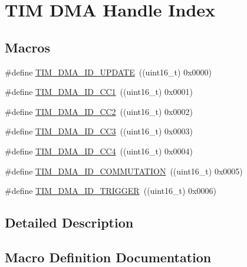 \hypertarget{group___d_m_a___handle__index}{}\section{T\+IM D\+MA Handle Index}
\label{group___d_m_a___handle__index}
\subsection*{Macros}
\begin{DoxyCompactItemize}
\item 
\#define \hyperlink{group___d_m_a___handle__index_ga15f38cee11f8b2b5a85cbf4552ba140d}{T\+I\+M\+\_\+\+D\+M\+A\+\_\+\+I\+D\+\_\+\+U\+P\+D\+A\+TE}~((uint16\+\_\+t) 0x0000)
\item 
\#define \hyperlink{group___d_m_a___handle__index_ga7ca691eb5e29b0206d3390cc6e90079a}{T\+I\+M\+\_\+\+D\+M\+A\+\_\+\+I\+D\+\_\+\+C\+C1}~((uint16\+\_\+t) 0x0001)
\item 
\#define \hyperlink{group___d_m_a___handle__index_ga9c52f32d4bd21dd2d232900219f0a111}{T\+I\+M\+\_\+\+D\+M\+A\+\_\+\+I\+D\+\_\+\+C\+C2}~((uint16\+\_\+t) 0x0002)
\item 
\#define \hyperlink{group___d_m_a___handle__index_ga6e8145f305b54744bf2ef379a4315a40}{T\+I\+M\+\_\+\+D\+M\+A\+\_\+\+I\+D\+\_\+\+C\+C3}~((uint16\+\_\+t) 0x0003)
\item 
\#define \hyperlink{group___d_m_a___handle__index_ga1860c00b370435ff40d9e65f14a61706}{T\+I\+M\+\_\+\+D\+M\+A\+\_\+\+I\+D\+\_\+\+C\+C4}~((uint16\+\_\+t) 0x0004)
\item 
\#define \hyperlink{group___d_m_a___handle__index_gaa707c98bb11277665635ca7aef1e4193}{T\+I\+M\+\_\+\+D\+M\+A\+\_\+\+I\+D\+\_\+\+C\+O\+M\+M\+U\+T\+A\+T\+I\+ON}~((uint16\+\_\+t) 0x0005)
\item 
\#define \hyperlink{group___d_m_a___handle__index_ga39900e5227e4d813a726a1df5d86671c}{T\+I\+M\+\_\+\+D\+M\+A\+\_\+\+I\+D\+\_\+\+T\+R\+I\+G\+G\+ER}~((uint16\+\_\+t) 0x0006)
\end{DoxyCompactItemize}


\subsection{Detailed Description}


\subsection{Macro Definition Documentation}
\mbox{\label{group___d_m_a___handle__index_ga7ca691eb5e29b0206d3390cc6e90079a}} 
